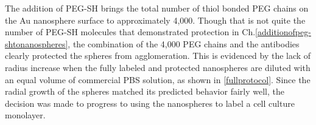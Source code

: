 The addition of PEG-SH brings the total number of thiol bonded PEG chains on the Au nanosphere surface to approximately 4,000. Though that is not quite the number of PEG-SH molecules that demonstrated protection in Ch.\autoref{additionofpeg-shtonanospheres}, the combination of the 4,000 PEG chains and the antibodies clearly protected the spheres from agglomeration. This is evidenced by the lack of radius increase when the fully labeled and protected nanospheres are diluted with an equal volume of commercial PBS solution, as shown in \autoref{fullprotocol}. Since the radial growth of the spheres matched its predicted behavior fairly well, the decision was made to progress to using the nanospheres to label a cell culture monolayer.	